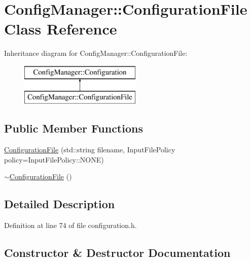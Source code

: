 \hypertarget{class_config_manager_1_1_configuration_file}{}\section{Config\+Manager\+:\+:Configuration\+File Class Reference}
\label{class_config_manager_1_1_configuration_file}
Inheritance diagram for Config\+Manager\+:\+:Configuration\+File\+:\begin{figure}[H]
\begin{center}
\leavevmode
\includegraphics[height=2.000000cm]{class_config_manager_1_1_configuration_file}
\end{center}
\end{figure}
\subsection*{Public Member Functions}
\begin{DoxyCompactItemize}
\item 
\hyperlink{class_config_manager_1_1_configuration_file_a07d5355e097215f22a31f8e3e1d73aae}{Configuration\+File} (std\+::string filename, Input\+File\+Policy policy=Input\+File\+Policy\+::\+N\+O\+NE)
\item 
\hyperlink{class_config_manager_1_1_configuration_file_ab58c1860cb0d3b502f674975000736a5}{$\sim$\+Configuration\+File} ()
\end{DoxyCompactItemize}


\subsection{Detailed Description}


Definition at line 74 of file configuration.\+h.



\subsection{Constructor \& Destructor Documentation}
